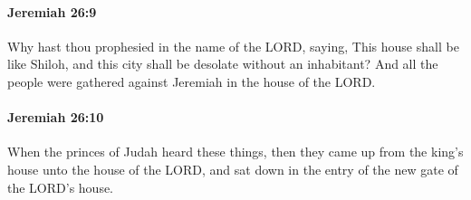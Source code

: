 		\paragraph{Jeremiah 26:9} %
			\label{JEREMIAH-26-9}

			Why hast thou prophesied in the name of the LORD, saying, This house shall be like Shiloh, and this city shall be desolate without an inhabitant? And all the people were gathered against Jeremiah in the house of the LORD.


		\paragraph{Jeremiah 26:10} %
			\label{JEREMIAH-26-10}

			When the princes of Judah heard these things, then they came up from the king’s house unto the house of the LORD, and sat down in the entry of the new gate of the LORD’s house.

